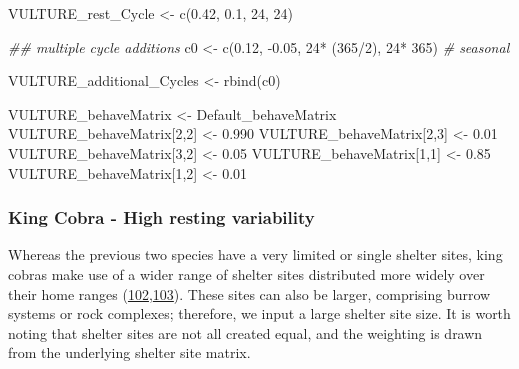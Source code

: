 \documentclass[10pt,a4paper]{article}
\newenvironment{Shaded}{}{}
\newcommand{\CommentTok}[1]{\textit{#1}}
\newcommand{\DecValTok}[1]{#1}
\newcommand{\DocumentationTok}[1]{\textit{#1}}
\newcommand{\FloatTok}[1]{#1}
\newcommand{\FunctionTok}[1]{#1}
\newcommand{\NormalTok}[1]{#1}
\newcommand{\OtherTok}[1]{#1}
\newcommand{\SpecialCharTok}[1]{#1}
\begin{document}
\begin{Shaded}
\begin{Highlighting}[]
\NormalTok{VULTURE\_rest\_Cycle }\OtherTok{\textless{}{-}} \FunctionTok{c}\NormalTok{(}\FloatTok{0.42}\NormalTok{, }\FloatTok{0.1}\NormalTok{, }\DecValTok{24}\NormalTok{, }\DecValTok{24}\NormalTok{)}

\DocumentationTok{\#\# multiple cycle additions}
\NormalTok{c0 }\OtherTok{\textless{}{-}} \FunctionTok{c}\NormalTok{(}\FloatTok{0.12}\NormalTok{, }\SpecialCharTok{{-}}\FloatTok{0.05}\NormalTok{, }\DecValTok{24}\SpecialCharTok{*}\NormalTok{ (}\DecValTok{365}\SpecialCharTok{/}\DecValTok{2}\NormalTok{), }\DecValTok{24}\SpecialCharTok{*} \DecValTok{365}\NormalTok{) }\CommentTok{\# seasonal}

\NormalTok{VULTURE\_additional\_Cycles }\OtherTok{\textless{}{-}} \FunctionTok{rbind}\NormalTok{(c0)}

\NormalTok{VULTURE\_behaveMatrix }\OtherTok{\textless{}{-}}\NormalTok{ Default\_behaveMatrix}
\NormalTok{VULTURE\_behaveMatrix[}\DecValTok{2}\NormalTok{,}\DecValTok{2}\NormalTok{] }\OtherTok{\textless{}{-}} \FloatTok{0.990}
\NormalTok{VULTURE\_behaveMatrix[}\DecValTok{2}\NormalTok{,}\DecValTok{3}\NormalTok{] }\OtherTok{\textless{}{-}} \FloatTok{0.01}
\NormalTok{VULTURE\_behaveMatrix[}\DecValTok{3}\NormalTok{,}\DecValTok{2}\NormalTok{] }\OtherTok{\textless{}{-}} \FloatTok{0.05}
\NormalTok{VULTURE\_behaveMatrix[}\DecValTok{1}\NormalTok{,}\DecValTok{1}\NormalTok{] }\OtherTok{\textless{}{-}} \FloatTok{0.85}
\NormalTok{VULTURE\_behaveMatrix[}\DecValTok{1}\NormalTok{,}\DecValTok{2}\NormalTok{] }\OtherTok{\textless{}{-}} \FloatTok{0.01}
\end{Highlighting}
\end{Shaded}

\hypertarget{king-cobra---high-resting-variability}{%
\subsubsection{King Cobra - High resting variability}\label{king-cobra---high-resting-variability}}

Whereas the previous two species have a very limited or single shelter sites, king cobras make use of a wider range of shelter sites distributed more widely over their home ranges (\protect\hyperlink{ref-Marshall2018}{102},\protect\hyperlink{ref-marshall_no_2020}{103}).
These sites can also be larger, comprising burrow systems or rock complexes; therefore, we input a large shelter site size.
It is worth noting that shelter sites are not all created equal, and the weighting is drawn from the underlying shelter site matrix.
\end{document}
